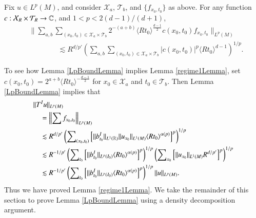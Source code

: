 \begin{lemma} \label{LpBoundLemma}
    Fix $u \in L^p(M)$, and consider $\mathcal{X}_{a}$, $\mathcal{T}_{b}$, and $\{ f_{x_0,t_0} \}$ as above. For any function $c: \mathcal{X}_R \times \mathcal{T}_R \to \operatorname{\mathbb{C}}$, and $1 < p < 2 (d-1) / (d+1)$,
    \begin{equation}
    \begin{split}
    &\Bigg\| \sum\nolimits_{a,b} \sum\nolimits_{(x_0,t_0) \in \mathcal{X}_{a} \times \mathcal{T}_{b}} 2^{-(a+b)} \langle R t_0 \rangle^{\frac{d-1}{2}} c(x_0,t_0) f_{x_0,t_0} \Big\|_{L^p(M)}\\
    &\quad\quad\quad\quad \lesssim R^{ d / p'} \left( \sum\nolimits_{a,b} \sum\nolimits_{(x_0,t_0) \in \mathcal{X}_{a} \times \mathcal{T}_{b}} |c(x_0,t_0)|^p \langle R t_0 \rangle^{d-1} \right)^{1/p}.
    \end{split}
    \end{equation}
\end{lemma}

To see how Lemma \ref{LpBoundLemma} implies Lemma \ref{regime1Lemma}, set $c(x_0,t_0) = 2^{a+b} \langle R t_0 \rangle^{- \frac{d-1}{2}}$ for $x_0 \in \mathcal{X}_{a}$ and $t_0 \in \mathcal{T}_{b}$. Then Lemma \ref{LpBoundLemma} implies that
%
\begin{equation}
\begin{split}
    &\| T^I u \|_{L^p(M)}\\
    &\quad = \left\| \sum f_{x_0,t_0} \right\|_{L^p(M)}\\
    &\quad \lesssim R^{d/p'} \left( \sum\nolimits_{(x_0,t_0)} \left[ \| b_{t_0}^I \|_{L^1(\operatorname{\mathbb{R}})} \| u_{x_0} \|_{L^1(M)} \langle R t_0 \rangle^{\alpha(p)} \right]^p \right)^{1/p}\\
    &\quad \lesssim R^{-1/p'} \left( \sum\nolimits_{t_0} \Big[ \| b_{t_0}^I \|_{L^p(I_0)} \langle R t_0 \rangle^{\alpha(p)} \Big]^p \right)^{1/p}\left( \sum\nolimits_{x_0} \left[ \| u_{x_0} \|_{L^1(M)}  R^{d/p'} \right]^p \right)^{1/p}\\
    &\quad \lesssim R^{-1/p'} \left( \sum\nolimits_{t_0} \Big[ \| b_{t_0}^I \|_{L^p(I_0)} \langle R t_0 \rangle^{\alpha(p)} \Big]^p \right)^{1/p} \| u \|_{L^p(M)}.
\end{split}
\end{equation}
%
Thus we have proved Lemma \ref{regime1Lemma}. We take the remainder of this section to prove Lemma \ref{LpBoundLemma} using a density decomposition argument.

